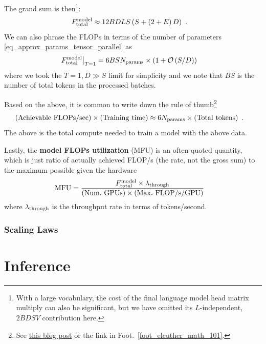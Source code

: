 \documentclass[11pt]{article}
\begin{document}
The grand sum is then\footnote{With a large vocabulary, the cost of the final language model head
matrix multiply can also be significant, but we have omitted its $ L $-independent,  $ 2BDSV $
contribution here. }:
\begin{align}
F _{ {\rm total}  } ^{ {\rm  model}  } &\approx 12 BDLS \left ( S + \left ( 2+E \right )D \right ) \label{eq_model_flops}\ .
\end{align}
We can also phrase the FLOPs in terms of the number of parameters \eqref{eq_approx_params_tensor_parallel} as
\begin{align}
 F _{ {\rm total}  } ^{ {\rm  model}  } \big| _{ T=1 }  &= 6BS N _{ {\rm  params}  }\times \left ( 1 + \mathcal{O} \left( S/D\right)  \right )
\end{align}
where we took the $ T=1, D \gg S $ limit for simplicity and we note that $ BS $  is the number of
total tokens in the processed batches.

Based on the above, it is common to write down the rule of
thumb\footnote{See
\href{https://medium.com/@dzmitrybahdanau/the-flops-calculus-of-language-model-training-3b19c1f025e4}{this
blog post} or the link in Foot.~\ref{foot_eleuther_math_101}.}
\begin{align}
  \left ( {\rm Achievable \ FLOPs/sec}  \right ) \times \left ( {\rm  Training \ time}  \right )
  &\approx 6 N _{ {\rm params}  } \times \left ( {\rm Total \ tokens} \right ) \ . \label{eq_training_rule_of_thumb}
\end{align}
The above is the total compute needed to train a model with the above data.


Lastly, the \textbf{model FLOPs utilization} (MFU) is an often-quoted quantity, which is just ratio
of actually achieved FLOP/s (the rate, not the gross sum) to the maximum possible given the hardware
\begin{align}
  {\rm MFU}  &= \frac{ F _{ {\rm total}  } ^{ {\rm  model}  } \times \lambda _{ {\rm through} } }{ \left ( {\rm Num. \ GPUs}  \right ) \times \left ( {\rm Max. \ FLOP/s/GPU}  \right ) }
\end{align}
where $ \lambda _{ {\rm through} } $ is the throughput rate in terms of tokens/second.

\section{Scaling Laws}

\part{Inference}
\end{document}
